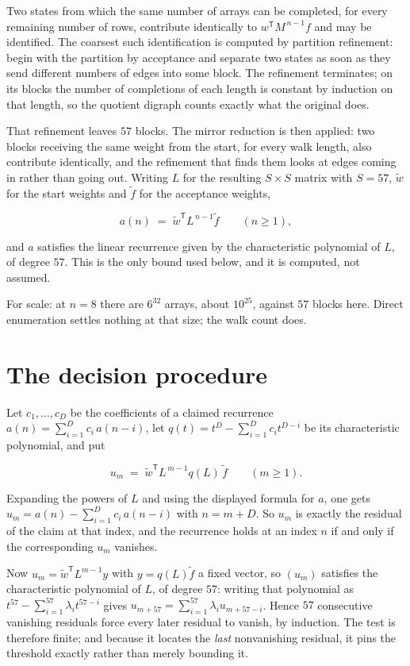 \documentclass[11pt]{article}
\theoremstyle{definition}
\begin{document}
Two states from which the same number of arrays can be completed, for every remaining number of rows, contribute identically to $w^{\mathsf T}M^{\,n-1}f$ and may be identified. The coarsest such identification is computed by partition refinement: begin with the partition by acceptance and separate two states as soon as they send different numbers of edges into some block. The refinement terminates; on its blocks the number of completions of each length is constant by induction on that length, so the quotient digraph counts exactly what the original does.

That refinement leaves $57$ blocks. The mirror reduction is then applied: two blocks receiving the same weight from the start, for every walk length, also contribute identically, and the refinement that finds them looks at edges coming in rather than going out. Writing $L$ for the resulting $S \times S$ matrix with $S = 57$, $\tilde w$ for the start weights and $\tilde f$ for the acceptance weights,

\[a(n) \;=\; \tilde w^{\mathsf T} L^{\,n-1} \tilde f \qquad (n \ge 1),\]

and $a$ satisfies the linear recurrence given by the characteristic polynomial of $L$, of degree $57$. This is the only bound used below, and it is computed, not assumed.

For scale: at $n = 8$ there are $6^{32}$ arrays, about $10^{25}$, against $57$ blocks here. Direct enumeration settles nothing at that size; the walk count does.

\section{The decision procedure}

Let $c_1,\dots,c_D$ be the coefficients of a claimed recurrence $a(n) = \sum_{i=1}^{D} c_i\,a(n-i)$, let $q(t) = t^{D} - \sum_{i=1}^{D} c_i t^{D-i}$ be its characteristic polynomial, and put

\[u_m \;=\; \tilde w^{\mathsf T} L^{\,m-1} q(L)\,\tilde f \qquad (m \ge 1).\]

Expanding the powers of $L$ and using the displayed formula for $a$, one gets $u_m = a(n) - \sum_{i=1}^{D} c_i\,a(n-i)$ with $n = m + D$. So $u_m$ is exactly the residual of the claim at that index, and the recurrence holds at an index $n$ if and only if the corresponding $u_m$ vanishes.

Now $u_m = \tilde w^{\mathsf T} L^{m-1} y$ with $y = q(L)\tilde f$ a fixed vector, so $(u_m)$ satisfies the characteristic polynomial of $L$, of degree $57$: writing that polynomial as $t^{57} - \sum_{i=1}^{57} \lambda_i t^{57-i}$ gives $u_{m+57} = \sum_{i=1}^{57} \lambda_i u_{m+57-i}$. Hence $57$ consecutive vanishing residuals force every later residual to vanish, by induction. The test is therefore finite; and because it locates the {\itshape last} nonvanishing residual, it pins the threshold exactly rather than merely bounding it.
\end{document}

